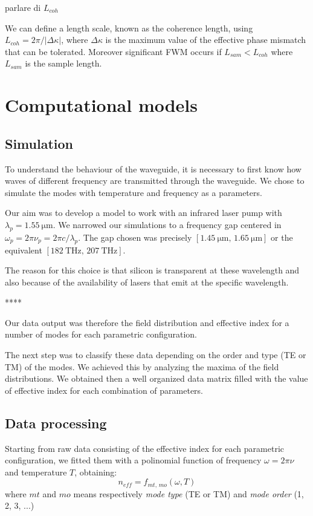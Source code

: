 \documentclass[12pt,a4paper,twoside]{article}
\begin{document}
parlare di $L_{coh}$

We can define a length scale, known as the coherence length, using $L_{coh} = 2\pi/|\Delta\kappa|$, where $\Delta\kappa$ is the maximum value of the effective phase mismatch that can be tolerated.
Moreover significant FWM occurs if $L_{sam}<L_{coh}$ where $L_{sam}$ is the sample length.

\section{Computational models}
\subsection{Simulation}
To understand the behaviour of the waveguide, it is necessary to first know how waves of different frequency are transmitted through the waveguide.
We chose to simulate the modes with temperature and frequency as a parameters.

Our aim was to develop a model to work with an infrared laser pump with $\lambda_{p} = \SI{1.55}{\um}$.
We narrowed our simulations to a frequency gap centered in $\omega_p = 2\pi \nu_p = 2\pi c / \lambda_{p}$.
The gap chosen was precisely $[\SI{1.45}{\um} ,\, \SI{1.65}{\um}]$ or the equivalent $[\SI{182}{\THz} ,\, \SI{207}{\THz}]$.

The reason for this choice is that silicon is transparent at these wavelength and also because of the availability of lasers that emit at the specific wavelength.

\vspace{18pt}
****
\vspace{12pt}

Our data output was therefore the field distribution and effective index for a number of modes for each parametric configuration.

The next step was to classify these data depending on the order and type (TE or TM) of the modes.
We achieved this by analyzing the maxima of the field distributions.
We obtained then a well organized data matrix filled with the value of effective index for each combination of parameters.

\subsection{Data processing}
Starting from raw data consisting of the effective index for each parametric configuration, we fitted them with a polinomial function of frequency $\omega = 2\pi \nu$ and temperature $T$, obtaining:
$$n_{eff} = f_{mt,\,mo} \left( \omega, T \right)$$
where $mt$ and $mo$ means respectively \textit{mode type} (TE or TM) and \textit{mode order} (1, 2, 3, ...)
\end{document}
